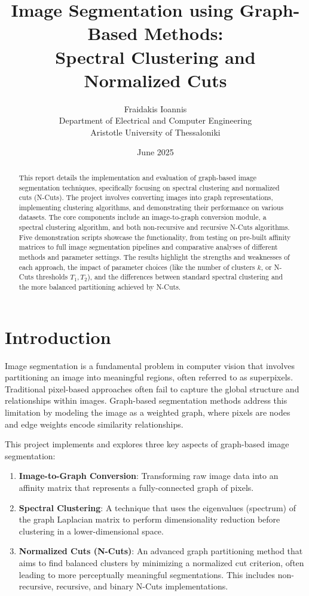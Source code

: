 \documentclass[12pt,a4paper]{article}
\title{\Large \textbf{Image Segmentation using Graph-Based Methods: \\ Spectral Clustering and Normalized Cuts}}
\author{Fraidakis Ioannis\\
\small Department of Electrical and Computer Engineering\\
\small Aristotle University of Thessaloniki}
\date{June 2025}
\begin{document}
\maketitle


\begin{abstract}
This report details the implementation and evaluation of graph-based image segmentation techniques, specifically focusing on spectral clustering and normalized cuts (N-Cuts). The project involves converting images into graph representations, implementing clustering algorithms, and demonstrating their performance on various datasets. The core components include an image-to-graph conversion module, a spectral clustering algorithm, and both non-recursive and recursive N-Cuts algorithms. Five demonstration scripts showcase the functionality, from testing on pre-built affinity matrices to full image segmentation pipelines and comparative analyses of different methods and parameter settings. The results highlight the strengths and weaknesses of each approach, the impact of parameter choices (like the number of clusters $k$, or N-Cuts thresholds $T_1, T_2$), and the differences between standard spectral clustering and the more balanced partitioning achieved by N-Cuts.
\end{abstract}



\section{Introduction}

Image segmentation is a fundamental problem in computer vision that involves partitioning an image into meaningful regions, often referred to as superpixels. Traditional pixel-based approaches often fail to capture the global structure and relationships within images. Graph-based segmentation methods address this limitation by modeling the image as a weighted graph, where pixels are nodes and edge weights encode similarity relationships.

This project implements and explores three key aspects of graph-based image segmentation:
\begin{enumerate}
    \item \textbf{Image-to-Graph Conversion}: Transforming raw image data into an affinity matrix that represents a fully-connected graph of pixels.
    \item \textbf{Spectral Clustering}: A technique that uses the eigenvalues (spectrum) of the graph Laplacian matrix to perform dimensionality reduction before clustering in a lower-dimensional space.
    \item \textbf{Normalized Cuts (N-Cuts)}: An advanced graph partitioning method that aims to find balanced clusters by minimizing a normalized cut criterion, often leading to more perceptually meaningful segmentations. This includes non-recursive, recursive, and binary N-Cuts implementations.
\end{enumerate}
\end{document}
